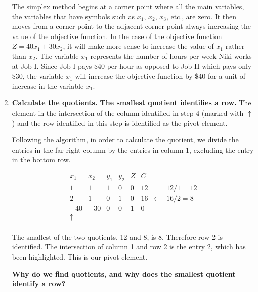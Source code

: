 \begin{solution}
\begin{enumerate}
              The simplex method begins at a corner point where all the main variables, the variables that have symbols such as $x_1$, $x_2$, $x_3$, etc., are zero. It then moves from a corner point to the adjacent corner point always increasing the value of the objective function. In the case of the objective function $Z = 40x_1 + 30x_2$, it will make more sense to increase the value of $x_1$ rather than $x_2$. The variable $x_1$ represents the number of hours per week Niki works at Job I. Since Job I pays \$40 per hour as opposed to Job II which pays only \$30, the variable $x_1$ will increase the objective function by \$40 for a unit of increase in the variable $x_1$.

        \item \textbf{ Calculate the quotients. The smallest quotient identifies a row.}
              The element in the intersection of the column identified in step 4 (marked with $\uparrow$) and the row identified in this step is identified as the pivot element.

              Following the algorithm, in order to calculate the quotient, we divide the entries in the far right column by the entries in column 1, excluding the entry in the bottom row.

              \[
                  \begin{array}{ccccc|ccc}

                      x_1      & x_2 & y_1 & y_2 & Z & C  &            &           \\

                      1        & 1   & 1   & 0   & 0 & 12 &            & 12/1 = 12 \\
                      2        & 1   & 0   & 1   & 0 & 16 & \leftarrow & 16/2 = 8  \\
                      \hline
                      -40      & -30 & 0   & 0   & 1 & 0  &            &           \\
                      \uparrow &     &     &     &   &    &            &           \\
                  \end{array}
              \]

              The smallest of the two quotients, 12 and 8, is 8. Therefore row 2 is identified. The intersection of column 1 and row 2 is the entry 2, which has been highlighted. This is our pivot element.

              \textbf{Why do we find quotients, and why does the smallest quotient identify a row?}


\end{enumerate}
\end{solution}
